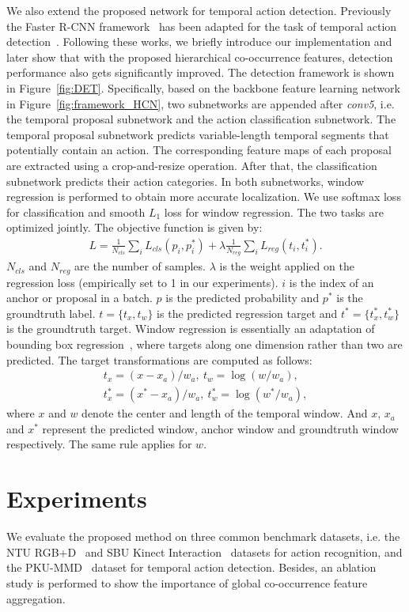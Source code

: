 \documentclass{article}
\begin{document}
We also extend the proposed network for temporal action detection. Previously the Faster R-CNN framework~\cite{Ren2015Faster} has been adapted for the task of temporal action detection~\cite{Rc3d,Li_2017_ICMEW}. Following these works, we briefly introduce our implementation and later show that with the proposed hierarchical co-occurrence features, detection performance also gets significantly improved. The detection framework is shown in Figure~\ref{fig:DET}. Specifically, based on the backbone feature learning network in Figure~\ref{fig:framework_HCN}, two subnetworks are appended after \emph{conv5}, i.e. the temporal proposal subnetwork and the action classification subnetwork. The temporal proposal subnetwork predicts variable-length temporal segments that potentially contain an action. The corresponding feature maps of each proposal are extracted using a crop-and-resize operation. After that, the classification subnetwork predicts their action categories. In both subnetworks, window regression is performed to obtain more accurate localization. We use softmax loss for classification and smooth $L_1$ loss for window regression. The two tasks are optimized jointly. The objective function is given by:
\begin{align}
  L=\frac{1}{N_{cls}}\sum_{i}L_{cls}(p_i,p_i^*)+
  \lambda \frac{1}{N_{reg}}\sum_{i}L_{reg}(t_i,t_i^*).
  \label{eq:reg_loss}
\end{align}
$N_{cls}$ and $N_{reg}$ are the number of samples. $\lambda$ is the weight applied on the regression loss (empirically set to 1 in our experiments). $i$ is the index of an anchor or proposal in a batch. $p$ is the predicted probability and $p^*$ is the groundtruth label. $t=\{t_x, t_w\}$ is the predicted regression target and $t^*=\{t_x^*, t_w^*\}$ is the groundtruth target. Window regression is essentially an adaptation of bounding box regression~\cite{girshick2014rich}, where targets along one dimension rather than two are predicted. The target transformations are computed as follows:
\begin{align}
  t_x=(x-x_a)/w_a,~t_w=\log(w/w_a),\\
  t_x^*=(x^*-x_a)/w_a,~t_w^*=\log(w^*/w_a),
\end{align}
where $x$ and $w$ denote the center and length of the temporal window. And $x$, $x_a$ and $x^*$ represent the predicted window, anchor window and groundtruth window respectively. The same rule applies for $w$.

\section{Experiments}
We evaluate the proposed method on three common benchmark datasets, i.e. the NTU RGB+D~\cite{NTURGBD} and SBU Kinect Interaction~\cite{SBU} datasets for action recognition, and the PKU-MMD~\cite{PKUMMD} dataset for temporal action detection. Besides, an ablation study is performed to show the importance of global co-occurrence feature aggregation.
\end{document}
